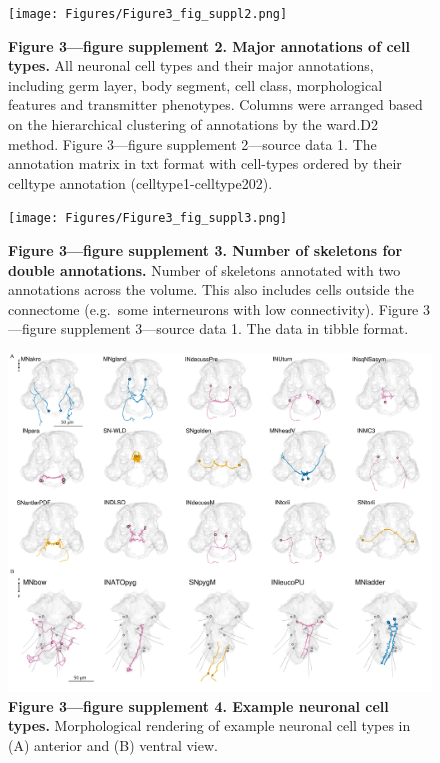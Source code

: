 \documentclass[
  11pt,
]{article}
\begin{document}
\begin{figure}[H]

{\centering \texttt{[image: Figures/Figure3\_fig\_suppl2.png]}

}

\caption{\textbf{Figure 3---figure supplement 2. Major annotations of
cell types.} All neuronal cell types and their major annotations,
including germ layer, body segment, cell class, morphological features
and transmitter phenotypes. Columns were arranged based on the
hierarchical clustering of annotations by the ward.D2 method. Figure
3---figure supplement 2---source data 1. The annotation matrix in txt
format with cell-types ordered by their celltype annotation
(celltype1-celltype202).}

\end{figure}%

\begin{figure}[H]

{\centering \texttt{[image: Figures/Figure3\_fig\_suppl3.png]}

}

\caption{\textbf{Figure 3---figure supplement 3. Number of skeletons for
double annotations. } Number of skeletons annotated with two annotations
across the volume. This also includes cells outside the connectome
(e.g.~some interneurons with low connectivity). Figure 3---figure
supplement 3---source data 1. The data in tibble format.}

\end{figure}%

\begin{figure}[H]

{\centering \includegraphics[width=1\textwidth,height=\textheight]{Figures/Figure3_fig_suppl4.png}

}

\caption{\textbf{Figure 3---figure supplement 4. Example neuronal cell
types. } Morphological rendering of example neuronal cell types in (A)
anterior and (B) ventral view.}

\end{figure}%
\end{document}
